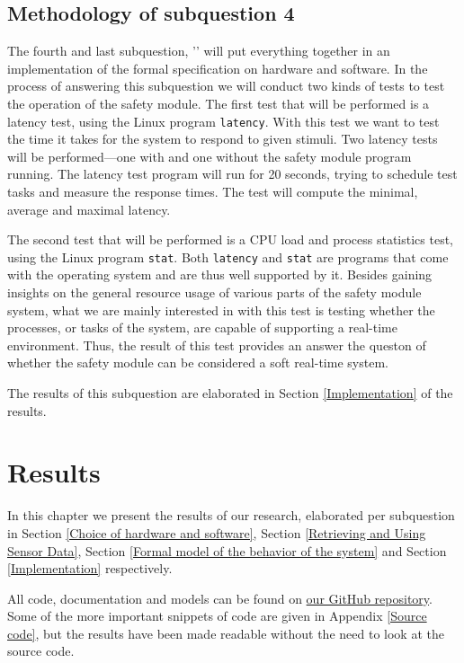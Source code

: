 \documentclass[12pt]{scrreprt}
\begin{document}
\section{Methodology of subquestion 4}
\label{Methodology of subquestion 4}
The fourth and last subquestion, '\sqfour' will put everything together in an implementation of the formal specification on hardware and software. In the process of answering this subquestion we will conduct two kinds of tests to test the operation of the safety module. The first test that will be performed is a latency test, using the Linux program \texttt{latency}. With this test we want to test the time it takes for the system to respond to given stimuli. Two latency tests will be performed---one with and one without the safety module program running. The latency test program will run for 20 seconds, trying to schedule test tasks and measure the response times. The test will compute the minimal, average and maximal latency.
\par
The second test that will be performed is a CPU load and process statistics test, using the Linux program \texttt{stat}. Both \texttt{latency} and \texttt{stat} are programs that come with the operating system and are thus well supported by it. Besides gaining insights on the general resource usage of various parts of the safety module system, what we are mainly interested in with this test is testing whether the processes, or tasks of the system, are capable of supporting a real-time environment. Thus, the result of this test provides an answer the queston of whether the safety module can be considered a soft real-time system.
\par
The results of this subquestion are elaborated in Section \ref{Implementation} of the results.


\chapter{Results}
\label{Results}
In this chapter we present the results of our research, elaborated per subquestion in Section \ref{Choice of hardware and software}, Section \ref{Retrieving and Using Sensor Data}, Section \ref{Formal model of the behavior of the system} and Section \ref{Implementation} respectively.
\par
All code, documentation and models can be found on \href{https://github.com/Yousousen/safety-module-for-care-robot-rose.git}{our GitHub repository}. Some of the more important snippets of code are given in Appendix \ref{Source code}, but the results have been made readable without the need to look at the source code.
\end{document}
